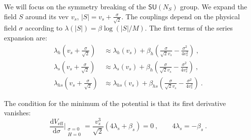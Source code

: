 \documentclass[aps,prd,preprintnumbers,nofootinbibn,twocolumn]{revtex4}
\newcommand{\dif}{\mathrm{d}}
\begin{document}
We will focus on the symmetry breaking of the $\mathsf{SU}(N_S)$ group. We expand the field $S$ around its vev $v_s$, $|S| = v_s + \frac{\sigma}{\sqrt{2}}$. The couplings depend on the physical field $\sigma$ according to $\lambda(|S|) = \beta \log(|S|/M)$. The first terms of the series expansion are:
\begin{subequations}
\begin{align}
\lambda_h\left(v_s + \frac{\sigma}{\sqrt{2}}\right) &\approx \lambda_h(v_s) + \beta_h \left(\frac{\sigma}{\sqrt{2}v_s}-\frac{\sigma^2}{4 v_s^2}\right)\ ,\\
\lambda_s\left(v_s + \frac{\sigma}{\sqrt{2}}\right) &\approx \lambda_s(v_s) + \beta_h \left(\frac{\sigma}{\sqrt{2}v_s}-\frac{\sigma^2}{4 v_s^2}\right)\ ,\\
\lambda_{hs}\left(v_s + \frac{\sigma}{\sqrt{2}}\right) &\approx \lambda_{hs}(v_s) + \beta_{hs} \left(\frac{\sigma}{\sqrt{2}v_s}-\frac{\sigma^2}{4 v_s^2}\right)\ .
\end{align}
\end{subequations}

The condition for the minimum of the potential is that its first derivative vanishes:
\begin{equation}
\frac{\dif V_\mathrm{eff}}{\dif \sigma}\Big|_{\substack{\sigma=0\\ H=0}} = \frac{v_s^3}{\sqrt{2}}(4\lambda_s + \beta_s) = 0\ ,  \qquad 4\lambda_s = - \beta_s \ . 
\end{equation}
\end{document}
